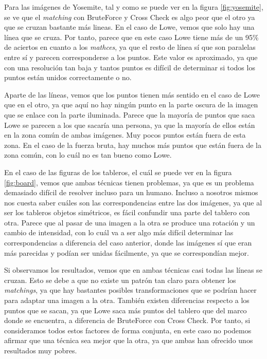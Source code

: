 \documentclass[11pt,a4paper]{article}
\begin{document}
Para las imágenes de Yosemite, tal y como se puede ver en la figura \ref{fig:yosemite},
se ve que el \textit{matching} con BruteForce y Cross Check es algo peor que el otro
ya que se cruzan bastante más lineas. En el caso de Lowe, vemos que solo hay una
línea que se cruza. Por tanto, parece que en este caso Lowe tiene más de un 95\% de aciertos
en cuanto a los \textit{mathces}, ya que el resto de línea sí que son paralelas entre sí y parecen
corresponderse a los puntos. Este valor es aproximado, ya que con una resolución tan baja
y tantos puntos es difícil de determinar si todos los puntos están unidos correctamente
o no.

Aparte de las líneas, vemos que los
puntos tienen más sentido en el caso de Lowe que en el otro, ya que aquí no hay ningún punto
en la parte oscura de la imagen que se enlace con la parte iluminada. Parece que
la mayoría de puntos que saca Lowe se parecen a los que sacaría una persona,
ya que la mayoría de ellos están en la zona común de ambas imágenes. Muy pocos
puntos están fuera de esta zona. En el caso de la fuerza bruta, hay muchos más puntos que están
fuera de la zona común, con lo cuál no es tan bueno como Lowe.

En el caso de las figuras de los tableros, el cuál se puede ver en la figura \ref{fig:board}, vemos que ambas técnicas tienen
problemas, ya que es un problema demasiado difícil de resolver incluso para un
humano. Incluso a nosotros mismos nos cuesta saber cuáles son las correspondencias
entre las dos imágenes, ya que al ser los tableros objetos simétricos, es fácil confundir
una parte del tablero con otra. Parece que al pasar de una imagen a la otra se produce una
rotación y un cambio de intensidad, con lo cuál va a ser algo más difícil determinar las
correspondencias a diferencia del caso anterior, donde las imágenes sí que eran más
parecidas y podían ser unidas fácilmente, ya que se correspondían mejor.

Si observamos los resultados, vemos que en ambas técnicas casi todas las líneas se cruzan.
Esto se debe a que no existe un patrón tan claro para obtener los \textit{matchings}, ya que
hay bastantes posibles transformaciones que se podrían hacer para adaptar una imagen a la otra.
También existen diferencias respecto a los puntos que se sacan, ya que Lowe saca más puntos del
tablero que del marco donde se encuentra, a diferencia de BruteForce con Cross Check. Por tanto, si
consideramos todos estos factores de forma conjunta, en este caso no podemos afirmar que una técnica
sea mejor que la otra, ya que ambas han ofrecido unos resultados muy pobres.
\end{document}
